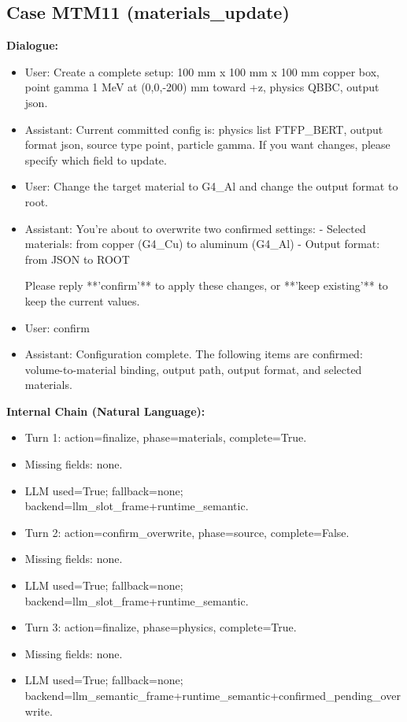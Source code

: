 \documentclass[11pt]{ctexart}
\begin{document}
\subsection{Case MTM11 (materials\_update)}
\textbf{Dialogue:}
\begin{itemize}
\item User: Create a complete setup: 100 mm x 100 mm x 100 mm copper box, point gamma 1 MeV at (0,0,-200) mm toward +z, physics QBBC, output json.
\item Assistant: Current committed config is: physics list FTFP\_BERT, output format json, source type point, particle gamma. If you want changes, please specify which field to update.
\item User: Change the target material to G4\_Al and change the output format to root.
\item Assistant: You're about to overwrite two confirmed settings:
- Selected materials: from copper (G4\_Cu) to aluminum (G4\_Al)
- Output format: from JSON to ROOT

Please reply **'confirm'** to apply these changes, or **'keep existing'** to keep the current values.
\item User: confirm
\item Assistant: Configuration complete. The following items are confirmed: volume-to-material binding, output path, output format, and selected materials.
\end{itemize}
\textbf{Internal Chain (Natural Language):}
\begin{itemize}
\item Turn 1: action=finalize, phase=materials, complete=True.
\item Missing fields: none.
\item LLM used=True; fallback=none; backend=llm\_slot\_frame+runtime\_semantic.
\item Turn 2: action=confirm\_overwrite, phase=source, complete=False.
\item Missing fields: none.
\item LLM used=True; fallback=none; backend=llm\_slot\_frame+runtime\_semantic.
\item Turn 3: action=finalize, phase=physics, complete=True.
\item Missing fields: none.
\item LLM used=True; fallback=none; backend=llm\_semantic\_frame+runtime\_semantic+confirmed\_pending\_overwrite.
\end{itemize}
\end{document}
